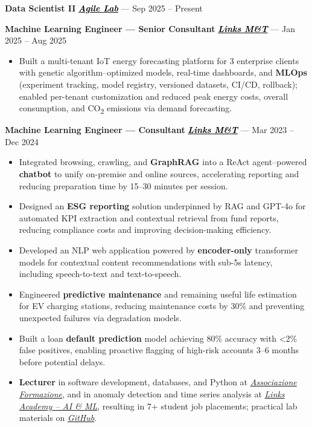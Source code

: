\documentclass[11pt,a4paper]{article}
\let\OldHref\href
\renewcommand{\href}[2]{\OldHref{#1}{\textit{#2}}}
\begin{document}
	{\small
		\textbf{Data Scientist II} \hfill \href{https://www.agilelab.it/}{\textbf{\textcolor{black}{Agile Lab}}} — Sep 2025 -- \hspace{0.5em} Present
		
		\textbf{Machine Learning Engineer — Senior Consultant} \hfill \href{https://www.linksmt.it/}{\textbf{\textcolor{black}{Links M\&T}}} — Jan 2025 -- Aug 2025
		\begin{itemize}
			\item Built a multi-tenant IoT energy forecasting platform for 3 enterprise clients with genetic algorithm–optimized models, real-time dashboards, and \textbf{MLOps} (experiment tracking, model registry, versioned datasets, CI/CD, rollback); enabled per-tenant customization and reduced peak energy costs, overall consumption, and CO\textsubscript{2} emissions via demand forecasting.
		\end{itemize}
		
		\textbf{Machine Learning Engineer — Consultant} \hfill \href{https://www.linksmt.it/}{\textbf{\textcolor{black}{Links M\&T}}} — Mar 2023 -- Dec 2024
		\begin{itemize}
			\item Integrated browsing, crawling, and \textbf{GraphRAG} into a ReAct agent–powered \textbf{chatbot} to unify on-premise and online sources, accelerating reporting and reducing preparation time by 15--30 minutes per session.
			\item Designed an \textbf{ESG reporting} solution underpinned by RAG and GPT-4o for automated KPI extraction and contextual retrieval from fund reports, reducing compliance costs and improving decision-making efficiency.
			\item Developed an NLP web application powered by \textbf{encoder-only} transformer models for contextual content recommendations with sub-5s latency, including speech-to-text and text-to-speech.
			\item Engineered \textbf{predictive maintenance} and remaining useful life estimation for EV charging stations, reducing maintenance costs by 30\% and preventing unexpected failures via degradation models.
			\item Built a loan \textbf{default prediction} model achieving 80\% accuracy with <2\% false positives, enabling proactive flagging of high-risk accounts 3--6 months before potential delays.
			\item \textbf{Lecturer} in software development, databases, and Python at \href{https://www.associazioneformazione.it/formazione-professionale/ifts-tecnico-per-la-progettazione-e-lo-sviluppo-di-applicazioni-informatiche}{\textit{Associazione Formazione}}, and in anomaly detection and time series analysis at \href{https://academy.linksmt.it/corso-di-formazione-post-laurea-artificial-intelligence-machine-learning/}{\textit{Links Academy – AI \& ML}}, resulting in 7+ student job placements; practical lab materials on \href{https://github.com/francesco-s/Links-Academy---Anomaly-Detection-Time-series-analysis}{\textit{GitHub}}.
		\end{itemize}
		
}
\end{document}
